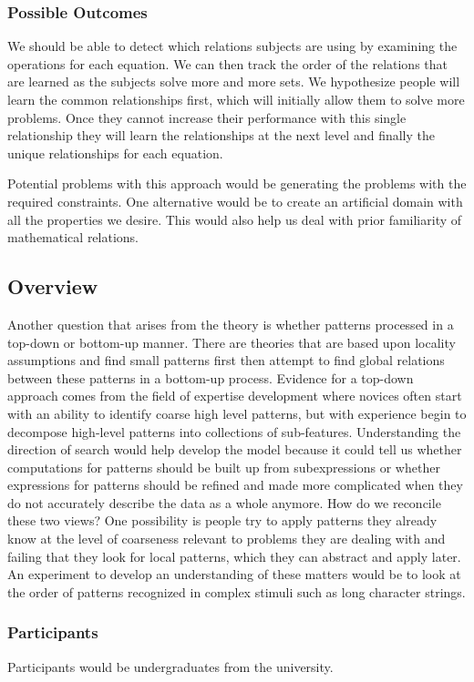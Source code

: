 \documentclass[doc]{apa}%
\begin{document}
\subsubsection{Possible Outcomes}
We should be able to detect which relations subjects are using by
examining the operations for each equation.  We can then track the
order of the relations that are learned as the subjects solve more and
more sets.  We hypothesize people will learn the common relationships
first, which will initially allow them to solve more problems.  Once
they cannot increase their performance with this single relationship they
will learn the relationships at the next level and finally the unique
relationships for each equation.  

Potential problems with this approach would be generating the problems
with the required constraints.  One alternative would be to create an
artificial domain with all the properties we desire.  This would also
help us deal with prior familiarity of mathematical relations.

\subsection{Overview}
    Another question that arises from the theory is whether patterns processed in a top-down or bottom-up manner.  There are theories that are based upon locality assumptions and find small patterns first then attempt to find global relations between these patterns in a bottom-up process.  Evidence for a top-down approach comes from the field of expertise development where novices often start with an ability to identify coarse high level patterns, but with experience begin to decompose high-level patterns into collections of sub-features.  Understanding the direction of search would help develop the model because it could tell us whether computations for patterns should be built up from subexpressions or whether expressions for patterns should be refined and made more complicated when they do not accurately describe the data as a whole anymore.  How do we reconcile these two views?  One possibility is people try to apply patterns they already know at the level of coarseness relevant to problems they are dealing with and failing that they look for local patterns, which they can abstract and apply later.  An experiment to develop an understanding of these matters would be to look at the order of patterns recognized in complex stimuli such as long character strings.
\subsubsection{Participants}
Participants would be undergraduates from the university.  
\end{document}
